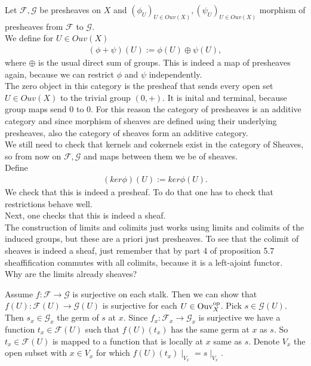 \begin{exercise}{3}
\begin{enumerate}
{            Let $\mathcal{F}, \mathcal{G}$ be presheaves on $X$ and $(\phi_U)_{U\in
            Ouv(X)}, (\psi_U)_{U\in Ouv(X)}$ morphism of presheaves from
            $\mathcal{F}$ to $\mathcal{G}$.\\ We define for $U\in Ouv(X)$
            \begin{align*}
                (\phi+\psi)(U):=\phi(U)\oplus \psi(U),
            \end{align*}
            where $\oplus$ is the usual direct sum of groups.
            This is indeed a map of presheaves again, because we can
            restrict $\phi$ and $\psi$ independently.\\
            The zero object in this category is the presheaf that sends 
            every open set $U\in Ouv(X)$ to the trivial group $(0,+)$. 
            It is inital and terminal, because group maps send $0$ to $0$.
            For this reason the category of presheaves is an additive category
            and since morphism of sheaves are defined using their underlying
            presheaves, also the category of sheaves form an additive category.\\
            We still need to check that kernels and cokernels exist in the 
            category of Sheaves, so from now on $\mathcal{F},\mathcal{G}$
            and maps between them we be of sheaves.\\
            Define 
            \begin{align*}
                (ker\phi)(U):=ker\phi(U).
            \end{align*}
            We check that this is indeed a presheaf. To do that one has 
            to check that restrictions behave well.\\
            Next, one checks that this is indeed a sheaf.\\
            The construction of limits and colimits just works using
            limits and colimits of the induced groups, but these are a
            priori just presheaves. To see that the colimit 
            of sheaves is indeed a sheaf, just
            remember that by part 4 of proposition 5.7 sheaffification
            commutes with all colimits, because it is a left-ajoint functor.\\
            Why are the limits already sheaves?

        \item{Assume $f \colon \mathcal{F} \rightarrow \mathcal{G}$ is
            surjective on each stalk. Then we can show that $f(U) \colon
            \mathcal{F}(U) \rightarrow \mathcal{G}(U)$ is surjective for each $U
            \in \operatorname{Ouv}^{\text{op}}_X$. Pick $s \in \mathcal{G}(U)$. Then $s_x \in
            \mathcal{G}_x$ the germ of $s$ at $x$. Since $f_x \colon
            \mathcal{F}_x \rightarrow \mathcal{G}_x$ is surjective we have a
            function $t_x \in \mathcal{F}(U)$ such that $f(U)(t_x)$ has the same
            germ at $x$ as $s$. So $t_x \in \mathcal{F}(U)$ is mapped to a
            function that is locally at $x$ same as $s$. Denote $V_x$ the open
            subset with $x \in V_x$ for which $f(U)(t_x) \mid_{V_x} = s
            \mid_{V_x}$.

}}
\end{enumerate}
\end{exercise}
